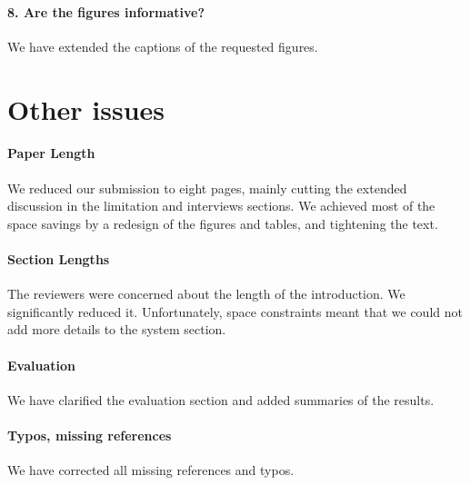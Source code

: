 \documentclass{article}
\begin{document}
\paragraph*{8. Are the figures informative?}
We have extended the captions of the requested figures.

\section*{Other issues}

\paragraph*{Paper Length} We reduced our submission to eight pages,
mainly cutting the extended discussion in the limitation
and interviews sections. We achieved most of the space savings
by a redesign of the figures and tables, and tightening
the text.

\paragraph*{Section Lengths} The reviewers were concerned about the length
of the introduction. We significantly reduced it. Unfortunately,
space constraints meant that we could not add more details to the
system section.

\paragraph*{Evaluation} We have clarified the evaluation section and added summaries of the results.

\paragraph*{Typos, missing references} We have corrected all missing references and typos.
\end{document}
